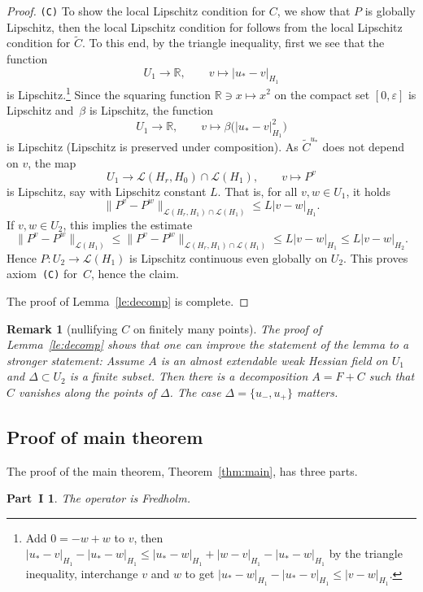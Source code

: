 \documentclass[pdftex]{sigma}
\numberwithin{equation}{section}
\newtheorem*{PartI}{Part~I}
\newtheorem{Remark}[Theorem]{Remark}
\newcommand{\D}{{\mathbb{D}}}
\newcommand{\R}{{\mathbb{R}}}
\newcommand{\Ll}{{\mathcal{L}}} %
\newcommand{\norm}{{\rm norm}}
\newcommand{\eps}{{\varepsilon}}
\def\abs#1{\mathopen|#1\mathclose|}
\def\norm#1{\mathopen\|#1\mathclose\|}
\newcommand{\p}{{\partial}}
\newcommand{\1}{{{\mathchoice {\rm 1\mskip-4mu l} {\rm 1\mskip-4mu l}
{\rm 1\mskip-4.5mu l} {\rm 1\mskip-5mu l}}}}
\begin{document}
\begin{proof}
\texttt{(C)}
To show the local Lipschitz condition for $C$, we show that
$P$ is globally Lipschitz, then the local Lipschitz condition for
 follows from the local Lipschitz condition for $\tilde
C$.
To this end, by the triangle inequality,
first we see that the function
\[
 U_1\to\R
 ,\qquad
 v\mapsto\abs{u_*-v}_{H_1}
\]
is Lipschitz.\footnote{
 Add $0=-w+w$ to $v$, then
 $\abs{u_*-v}_{H_1}-\abs{u_*-w}_{H_1}
 \le \abs{u_*-w}_{H_1}+\abs{w-v}_{H_1}-\abs{u_*-w}_{H_1}$
 by the triangle inequality, interchange $v$ and $w$ to get
 $\abs{u_*-w}_{H_1}-\abs{u_*-v}_{H_1}\le \abs{v-w}_{H_1}$.
 }
%
Since the squaring function $\R\ni x\mapsto x^2$ on the compact set
$[0,\eps]$ is Lipschitz and~$\beta$ is Lipschitz, the function
\[
 U_1\to\R
 ,\qquad
 v\mapsto\beta\bigl(\abs{u_*-v}_{H_1}^2\bigr)
\]
is Lipschitz (Lipschitz is preserved under composition).
As $\tilde C^{u_*}$ does not depend on $v$, the map
\[
 U_1\to \Ll(H_r,H_0)\cap\Ll(H_1)
 ,\qquad
 v\mapsto P^v
\]
is Lipschitz, say with Lipschitz constant $L$. That is, for all
$v,w\in U_1$, it holds
\[
 \norm{P^v-P^w}_{\Ll(H_r,H_1)\cap\Ll(H_1)}\le L\abs{v-w}_{H_1} .
\]
If $v,w\in U_2$, this implies the estimate
\[
 \norm{P^v-P^w}_{\Ll(H_1)}
 \le \norm{P^v-P^w}_{\Ll(H_r,H_1)\cap\Ll(H_1)}
 \le L\abs{v-w}_{H_1}
 \le L\abs{v-w}_{H_2}.
\]
Hence $P\colon U_2\to\Ll(H_1)$ is Lipschitz continuous
even globally on $U_2$.
This proves axiom~\texttt{(C)} for~$C$, hence the claim.

The proof of Lemma~\ref{le:decomp} is complete.
\end{proof}

\begin{Remark}[nullifying $C$ on finitely many points]
\label{rem:decomp}
The proof of Lemma~\ref{le:decomp} shows that one can improve the
statement of the lemma to a stronger statement:
%
Assume $A$ is an almost extendable weak Hessian field on $U_1$
and $\Delta\subset U_2$ is a finite subset.
Then there is a decomposition $A=F+C$
such that $C$ vanishes along the points of $\Delta$.
The case $\Delta=\{u_-,u_+\}$ matters.
\end{Remark}

\subsection{Proof of main theorem}

The proof of the main theorem, Theorem~\ref{thm:main},
has three parts.

\begin{PartI}
The operator
\smash{$\D^u=\p_s+A^u\colon W^{1,2}_{H_0}\cap L^2_{H_1}\to L^2_{H_0}$}
is Fredholm.
\end{PartI}
\end{document}
